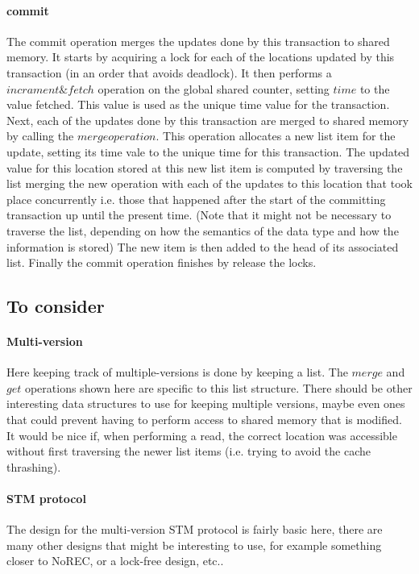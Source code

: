 \documentclass[11pt,letterpaper]{article}
\begin{document}
\paragraph{commit}
The commit operation merges the updates done by this transaction
to shared memory.
It starts by acquiring a lock for each of the locations updated by this transaction
(in an order that avoids deadlock).
It then performs a $\mathit{incrament\&fetch}$ operation on the global shared counter,
setting $\mathit{time}$ to the value fetched.
This value is used as the unique time value for the transaction.
Next, each of the updates done by this transaction are merged to shared memory by
calling the $\mathit{merge operation}$.
This operation allocates a new list item for the update, setting its time vale
to the unique time for this transaction.
The updated value for this location stored at this new list item is computed by traversing the list merging
the new operation with each of the updates to this location that took place concurrently i.e. those that happened
after the start of the committing transaction up until the present time.
(Note that it might not be necessary to traverse the list, depending on how the semantics of the
data type and how the information is stored)
The new item is then added to the head of its associated list.
Finally the commit operation finishes by release the locks.


\subsection{To consider}
\paragraph{Multi-version}
Here keeping track of multiple-versions is done by keeping a list.
The $\mathit{merge}$ and $\mathit{get}$ operations shown here are specific to this list structure.
There should be other interesting data structures to use for keeping multiple versions, maybe
even ones that could prevent having to perform access to shared memory that is modified.
It would be nice if, when performing a read, the correct location was accessible without first traversing the newer
list items (i.e. trying to avoid the cache thrashing).

\paragraph{STM protocol}
The design for the multi-version STM protocol is fairly basic here, there are many other designs that might
be interesting to use, for example something closer to NoREC, or
a lock-free design, etc..
\end{document}
